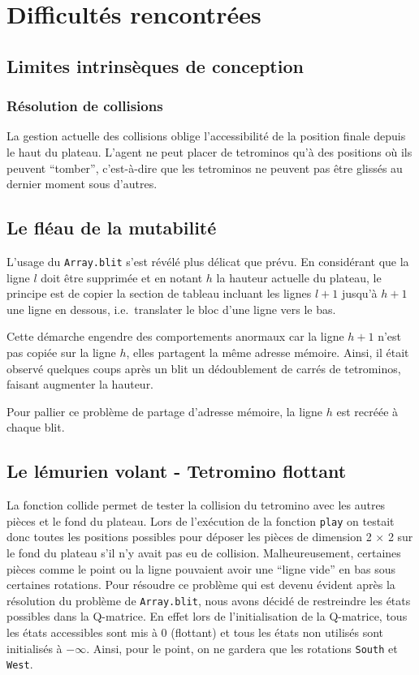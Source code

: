 \documentclass{report}
\begin{document}
\chapter{Difficultés rencontrées}

\section{Limites intrinsèques de conception}
\subsection{Résolution de collisions}
La gestion actuelle des collisions oblige l'accessibilité de la position finale
depuis le haut du plateau. L'agent ne peut placer de tetrominos qu'\`a des
positions o\`u ils peuvent ``tomber'', c'est-\`a-dire que les tetrominos ne
peuvent pas être glissés au dernier moment sous d'autres.

\section{Le fléau de la mutabilité}
L'usage du \texttt{Array.blit} s'est révélé plus délicat que prévu. En
considérant que la ligne \(l\) doit être supprimée et en notant \(h\) la hauteur
actuelle du plateau, le principe est de copier la section de tableau incluant
les lignes \(l+1\) jusqu'à \(h+1\) une ligne en dessous, i.e.\ translater le
bloc d'une ligne vers le bas.

Cette démarche engendre des comportements anormaux car la ligne \(h+1\) n'est
pas copiée sur la ligne \(h\), elles partagent la même adresse mémoire. Ainsi,
il était observé quelques coups après un blit un dédoublement de carrés de
tetrominos, faisant augmenter la hauteur.

Pour pallier ce problème de partage d'adresse mémoire, la ligne \(h\) est
recréée à chaque blit.

\section{Le lémurien volant - Tetromino flottant}\label{sec:hollandais_volant}
La fonction collide permet de tester la collision du tetromino avec les autres
pièces et le fond du plateau. Lors de l'exécution de la fonction \texttt{play}
on testait donc toutes les positions possibles pour déposer les pièces de
dimension 2 \(\times \) 2 sur le fond du plateau s'il n'y avait pas eu de
collision. Malheureusement, certaines pièces comme le point ou la ligne
pouvaient avoir une ``ligne vide'' en bas sous certaines rotations. Pour
résoudre ce problème qui est devenu évident après la résolution du problème de
\texttt{Array.blit}, nous avons décidé de restreindre les états possibles dans
la Q-matrice. En effet lors de l'initialisation de la Q-matrice, tous les états
accessibles sont mis à 0 (flottant) et tous les états non utilisés sont
initialisés à \(-\infty \). Ainsi, pour le point, on ne gardera que les
rotations \texttt{South} et \texttt{West}.
\end{document}
